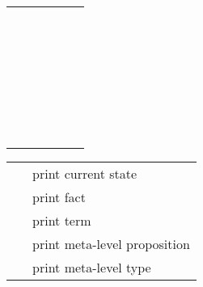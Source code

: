 \begin{isabellebody}
\begin{isamarkuptext}
\begin{tabular}{rcl}
      \mbox{\isa{\isacommand{moreover}}}~\mbox{\isa{\isacommand{from}}}~\isa{calculation} \\[0.5ex]
    \mbox{\isa{\isacommand{presume}}}~\isa{{\isachardoublequote}a{\isacharcolon}\ {\isasymphi}{\isachardoublequote}} & \isa{{\isachardoublequote}{\isasymapprox}{\isachardoublequote}} &
      \mbox{\isa{\isacommand{assume}}}~\isa{{\isachardoublequote}a{\isacharcolon}\ {\isasymphi}{\isachardoublequote}} \\
    \mbox{\isa{\isacommand{def}}}~\isa{{\isachardoublequote}a{\isacharcolon}\ x\ {\isasymequiv}\ t{\isachardoublequote}} & \isa{{\isachardoublequote}{\isasymapprox}{\isachardoublequote}} &
      \mbox{\isa{\isacommand{fix}}}~\isa{x}~\mbox{\isa{\isacommand{assume}}}~\isa{{\isachardoublequote}a{\isacharcolon}\ x\ {\isasymequiv}\ t{\isachardoublequote}} \\
    \mbox{\isa{\isacommand{obtain}}}~\isa{{\isachardoublequote}x\ {\isasymWHERE}\ a{\isacharcolon}\ {\isasymphi}{\isachardoublequote}} & \isa{{\isachardoublequote}{\isasymapprox}{\isachardoublequote}} &
      \isa{{\isachardoublequote}{\isasymdots}{\isachardoublequote}}~\mbox{\isa{\isacommand{fix}}}~\isa{x}~\mbox{\isa{\isacommand{assume}}}~\isa{{\isachardoublequote}a{\isacharcolon}\ {\isasymphi}{\isachardoublequote}} \\
    \mbox{\isa{\isacommand{case}}}~\isa{c} & \isa{{\isachardoublequote}{\isasymapprox}{\isachardoublequote}} &
      \mbox{\isa{\isacommand{fix}}}~\isa{x}~\mbox{\isa{\isacommand{assume}}}~\isa{{\isachardoublequote}c{\isacharcolon}\ {\isasymphi}{\isachardoublequote}} \\
    \mbox{\isa{\isacommand{sorry}}} & \isa{{\isachardoublequote}{\isasymapprox}{\isachardoublequote}} &
      \mbox{\isa{\isacommand{by}}}~\isa{cheating} \\
  \end{tabular}%
\end{isamarkuptext}%
\isamarkuptrue%
%
\isamarkuptrue%
%
\begin{isamarkuptext}%
\begin{tabular}{ll}
    \mbox{\isa{\isacommand{pr}}} & print current state \\
    \mbox{\isa{\isacommand{thm}}}~\isa{a} & print fact \\
    \mbox{\isa{\isacommand{term}}}~\isa{t} & print term \\
    \mbox{\isa{\isacommand{prop}}}~\isa{{\isasymphi}} & print meta-level proposition \\
    \mbox{\isa{\isacommand{typ}}}~\isa{{\isasymtau}} & print meta-level type \\

\end{tabular}
\end{isamarkuptext}
\end{isabellebody}
